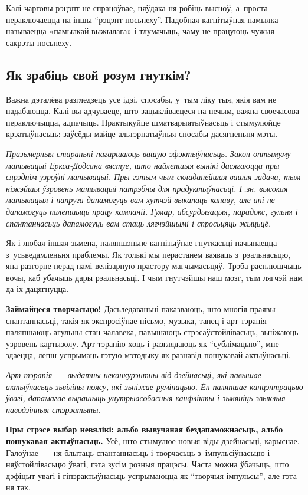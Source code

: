 Калі чарговы рэцэпт не спрацоўвае, няўдака ня робіць высноў, а~проста пераключаецца на іншы ``рэцэпт посьпеху''. Падобная кагнітыўная памылка называецца «памылкай выжылага» і тлумачыць, чаму не працуюць чужыя сакрэты посьпеху. 

\subsection*{Як зрабіць свой розум гнуткім?}

Важна дэталёва разгледзець усе ідэі, спосабы, у~тым ліку тыя, якія вам не падабаюцца. Калі вы адчуваеце, што зацыкліваецеся на нечым, важна своечасова пераключыцца, адпачыць. Практыкуйце шматварыятыўнасьць і стымулюйце крэатыўнасьць: заўсёды майце альтэрнатыўныя спосабы дасягненьня мэты. 

\emph{Празьмерныя стараньні пагаршаюць вашую эфэктыўнасьць. Закон оптымуму матывацыі Еркса-Додсана вястуе, што найлепшыя вынікі дасягаюцца пры сярэднім узроўні матывацыі. Пры гэтым чым складанейшая вашая задача, тым ніжэйшы ўзровень матывацыі патрэбны для прадуктыўнасьці. Г.зн. высокая матывацыя і напруга дапамогуць вам хутчэй выкапаць канаву, але ані не дапамогуць палепшыць працу кампаніі. Гумар, абсурдызацыя, парадокс, гульня і спантаннасьць дапамогуць вам стаць лягчэйшымі і спросьцяць жыцьцё.}

Як і любая іншая зьмена, паляпшэньне кагнітыўнае гнуткасьці пачынаецца з~усьведамленьня праблемы. Як толькі мы перастанем ваяваць з~рэальнасьцю, яна разгорне перад намі велізарную прастору магчымасьцяў. Трэба расплюшчыць вочы, каб убачыць дары рэальнасьці. І чым гнутчэйшы наш мозг, тым лягчэй нам да іх дацягнуцца.

\textbf{Займайцеся творчасьцю!} Дасьледаваньні паказваюць, што многія праявы спантаннасьці, такія як экспрэсіўнае пісьмо, музыка, танец і арт-тэрапія паляпшаюць агульны стан чалавека, павышаюць стрэсаўстойлівасьць, зьніжаюць узровень картызолу. Арт-тэ\-ра\-пію хоць і разглядаюць як ``сублімацыю'', мне здаецца, лепш успрымаць гэтую мэтодыку як разнавід пошукавай актыўнасьці.

\emph{Арт-тэрапія~--- выдатны неканкурэнтны від дзейнасьці, які павышае актыўнасьць зьвіліны поясу, які зьніжае румінацыю. Ён паляпшае канцэнтрацыю ўвагі, дапамагае вырашыць унутрыасобасныя канфлікты і зьмяніць звыклыя паводзінныя стэрэатыпы.}

\textbf{Пры стрэсе выбар невялікі: альбо вывучаная бездапаможнасьць, альбо пошукавая актыўнасьць.} Усё, што стымулюе новыя віды дзейнасьці, карыснае. Галоўнае~--- ня блытаць спантаннасьць і творчасьць з~імпульсіўнасьцю і няўстойлівасьцю ўвагі, гэта зусім розныя працэсы. Часта можна ўбачыць, што дэфіцыт увагі і гіпэрактыўнасьць успрымаюцца як ``творчыя імпульсы'', але гэта ня так.

